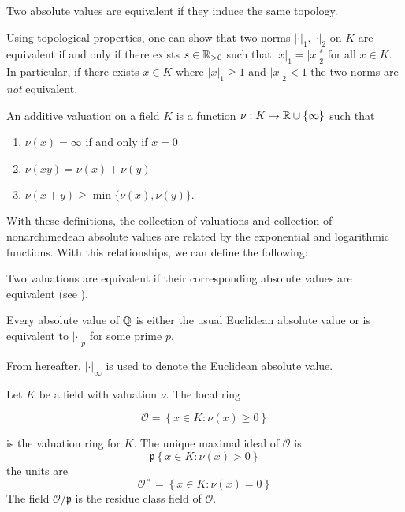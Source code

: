 \begin{definition}[Equivalent]
    Two absolute values are equivalent if they induce the same topology.
\end{definition}

Using topological properties, one can show that two norms $|\cdot|_1, |\cdot|_2$ on $K$ are equivalent if and only if there exists $s \in \mathbb{R}_{>0}$ such that $|x|_1 = |x|_2^s$ for all $x \in K$. In particular, if there exists $x \in K$ where $|x|_1 \geq 1$ and $|x|_2 < 1$ the two norms are \emph{not} equivalent.

\begin{definition}
    An additive valuation on a field $K$ is a function $\nu: K \to \mathbb{R} \cup \{\infty\}$ such that 
    \begin{enumerate}[(1)]
        \item $\nu(x) = \infty$ if and only if  $x = 0$
        \item $\nu(xy) = \nu(x) + \nu(y)$
        \item $\nu(x+y) \geq \min\{\nu(x), \nu(y)\}$.
    \end{enumerate}
\end{definition}

With these definitions, the collection of valuations and collection of nonarchimedean absolute values are related by the exponential and logarithmic functions. With this relationships, we can define the following:

\begin{definition}
    Two valuations are equivalent if their corresponding absolute values are equivalent (see ).
\end{definition}

\begin{proposition}
    Every absolute value of $\mathbb{Q}$ is either the usual Euclidean absolute value or is equivalent to $|\cdot|_p$ for some prime $p$.
\end{proposition}

From hereafter, $|\cdot|_\infty$ is used to denote the Euclidean absolute value.

\begin{definition}
    Let $K$ be a field with valuation $\nu$. The local ring 

    \[ \mathcal{O} = \left\{x \in K: \nu(x) \geq 0\right\}\]

    is the valuation ring for $K$. The unique maximal ideal of $\mathcal{O}$ is 
        \[\mathfrak{p} \left\{x \in K: \nu(x) > 0\right\}\]
    the units are
        \[\mathcal{O}^\times = \left\{x \in K : \nu(x) = 0\right\}\]
    The field $\mathcal{O}/\mathfrak{p}$ is the residue class field of $\mathcal{O}$.
\end{definition}

